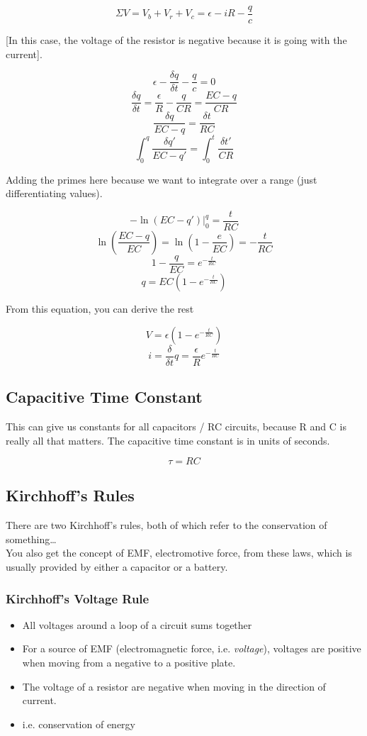 \documentclass{article}
\begin{document}
$$\Sigma V = V_b + V_r + V_c = \epsilon - iR - \frac{q}{c}$$

[In this case, the voltage of the resistor is negative because it is going with the current].

$$\epsilon - \frac{\delta q}{\delta t} - \frac{q}{c} = 0$$
$$\frac{\delta q}{\delta t} = \frac{\epsilon}{R} - \frac{q}{CR} = \frac{EC - q}{CR}$$
$$\frac{\delta q}{EC - q} = \frac{\delta t}{RC}$$
$$\int_{0}^{q} \frac{\delta q'}{EC - q'} = \int_{0}^{t} \frac{\delta t'}{CR} $$

Adding the primes here because we want to integrate over a range (just differentiating values).

$$-\ln(EC - q')|_{0}^q = \frac{t}{RC}$$
$$\ln(\frac{EC - q}{EC}) = \ln(1-\frac{e}{EC}) = - \frac{t}{RC}$$
$$1 - \frac{q}{EC} = e^{-\frac{t}{RC}}$$
$$q = EC(1-e^{-\frac{t}{RC}})$$

From this equation, you can derive the rest

$$V = \epsilon(1-e^{-\frac{t}{RC}})$$
$$i = \frac{\delta}{\delta t} q = \frac{\epsilon}{R} e^{-\frac{t}{RC}}$$

\subsection{Capacitive Time Constant}

This can give us constants for all capacitors / RC circuits, because R and C is really all that matters. The capacitive time constant is in units of seconds.

$$\tau = RC$$

\subsection{Kirchhoff's Rules}

There are two Kirchhoff's rules, both of which refer to the conservation of something\dots \\
You also get the concept of EMF, electromotive force, from these laws, which is usually provided by either a capacitor or a battery.

\subsubsection{Kirchhoff's Voltage Rule}

\begin{itemize}
    \item All voltages around a loop of a circuit sums together 
    \item For a source of EMF (electromagnetic force, i.e. \emph{voltage}), voltages are positive when  moving from a negative to a positive plate.
    \item The voltage of a resistor are negative when moving in the direction of current.
    \item i.e. conservation of energy
\end{itemize}
\end{document}
